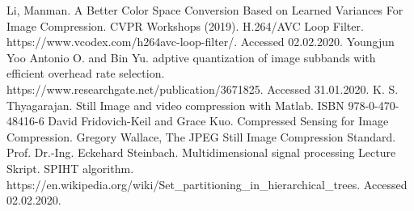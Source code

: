 \documentclass[twocolumn]{article}  %
\begin{document}
\newpage
\begin{thebibliography}{50} %
Li, Manman.  A Better Color Space Conversion Based on Learned Variances For Image Compression. CVPR Workshops (2019).
H.264/AVC Loop Filter. https://www.vcodex.com/h264avc-loop-filter/. Accessed 02.02.2020.
Youngjun Yoo Antonio O. and Bin Yu. adptive quantization of image subbands with efficient overhead rate selection.  https://www.researchgate.net/publication/3671825.
Accessed 31.01.2020.
 K. S. Thyagarajan. Still Image and video compression with Matlab. ISBN 978-0-470-48416-6 
 David Fridovich-Keil and Grace Kuo. Compressed Sensing for Image Compression.
 Gregory Wallace, The JPEG Still Image Compression Standard.
 Prof. Dr.-Ing. Eckehard Steinbach. Multidimensional signal processing Lecture Skript.
 SPIHT algorithm. \\
https://en.wikipedia.org/wiki/Set\_partitioning\_in\_hierarchical\_trees. Accessed 02.02.2020.
\end{thebibliography}
\end{document}
